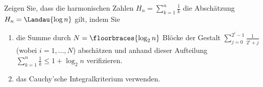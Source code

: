 
\begin{exercise}

Zeigen Sie, dass die harmonischen Zahlen $H_n = \sum_{k=1}^n \frac{1}{k}$ die Abschätzung $H_n = \Landau{\log{n}}$ gilt, indem Sie

\begin{enumerate}
    \item die Summe durch $N = \floorbraces{\log_2{n}}$ Blöcke der Gestalt $\sum_{j=0}^{2^i - 1} \frac{1}{2^i + j}$ (wobei $i= 1, \ldots, N$) abschätzen und anhand dieser Aufteilung $\sum_{k=1}^n \frac{1}{k} \leq 1 + \log_2{n}$ verifizieren.
    \item das Cauchy’sche Integralkriterium verwenden.
\end{enumerate}

\end{exercise}


